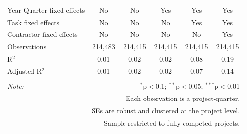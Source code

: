 \documentclass[
]{article}
\begin{document}
\begin{table}[H]
\begin{tabular}{@{\extracolsep{-2pt}}lccccc}
Year-Quarter fixed effects & No & No & Yes & Yes & Yes \\ 
Task fixed effects & No & No & No & Yes & Yes \\ 
Contractor fixed effects & No & No & No & No & Yes \\ 
Observations & 214,483 & 214,415 & 214,415 & 214,415 & 214,415 \\ 
R$^{2}$ & 0.01 & 0.02 & 0.02 & 0.08 & 0.19 \\ 
Adjusted R$^{2}$ & 0.01 & 0.02 & 0.02 & 0.07 & 0.14 \\ 
\hline 
\hline \\[-1.8ex] 
\textit{Note:}  & \multicolumn{5}{r}{$^{*}$p$<$0.1; $^{**}$p$<$0.05; $^{***}$p$<$0.01} \\ 
 & \multicolumn{5}{r}{Each observation is a project-quarter.} \\ 
 & \multicolumn{5}{r}{SEs are robust and clustered at the project level.} \\ 
 & \multicolumn{5}{r}{Sample restricted to fully competed projects.} \\ 
\end{tabular} 
\end{table}
\end{document}

